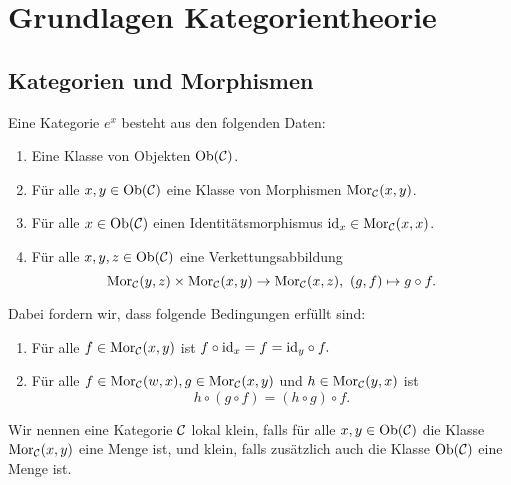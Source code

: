 \chapter{Grundlagen Kategorientheorie}
\section{Kategorien und Morphismen}
\begin{Def}[Kategorie]
    Eine Kategorie \( e^x \) besteht aus den folgenden Daten:
    \begin{enumerate}
        \item Eine Klasse von Objekten \(\operatorname{Ob}(\mathcal{C})\).
        \item Für alle \(x,y\in\operatorname{Ob}(\mathcal{C})\) eine Klasse von Morphismen \(\operatorname{Mor}_{\mathcal{C}}(x,y)\).
        \item Für alle \(x\in\operatorname{Ob}(\mathcal{C})\) einen Identitätsmorphismus \(\mathrm{id}_x\in\operatorname{Mor}_{\mathcal{C}}(x,x)\).
        \item Für alle \(x,y,z\in\operatorname{Ob}(\mathcal{C})\) eine Verkettungsabbildung 
        \[\operatorname{Mor}_{\mathcal{C}}(y,z)\times \operatorname{Mor}_{\mathcal{C}}(x,y)\to \operatorname{Mor}_{\mathcal{C}}(x,z),\ (g,f)\mapsto g\circ f.\]
    \end{enumerate}
    Dabei fordern wir, dass folgende Bedingungen erfüllt sind:
    \begin{enumerate}
        \item Für alle \(f\in\operatorname{Mor}_{\mathcal{C}}(x,y)\) ist
        \(f\circ \mathrm{id}_x=f=\mathrm{id}_y\circ f.\)
        \item Für alle \(f\in\operatorname{Mor}_{\mathcal{C}}(w,x), g\in\operatorname{Mor}_{\mathcal{C}}(x,y)\) und \(h\in\operatorname{Mor}_{\mathcal{C}}(y,x)\) ist 
        \[h\circ (g\circ f)=(h\circ g)\circ f.\]
    \end{enumerate}
    Wir nennen eine Kategorie \(\mathcal{C}\) lokal klein, falls für alle \(x,y\in\operatorname{Ob}(\mathcal{C})\) die Klasse \(\operatorname{Mor}_{\mathcal{C}}(x,y)\) eine Menge ist, und klein, falls zusätzlich auch die Klasse \(\operatorname{Ob}(\mathcal{C})\) eine Menge ist.
\end{Def}
